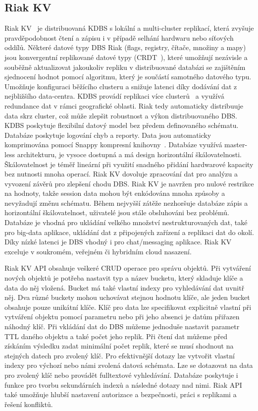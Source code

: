 \documentclass[czech,master,dept460,male,csharp,cpdeclaration]{diploma}
\begin{document}
	\subsection{Riak KV} \label{lab-riak}
	
	Riak KV~\cite{riak} je distribuovaná KDBS s lokální a multi-cluster replikací, která zvyšuje pravděpodobnost čtení a zápisu i v případě selhání hardwaru nebo síťových oddílů. Některé datové typy DBS Riak (flags, registry, čítače, množiny a mapy) jsou konvergentní replikované datové typy (CRDT~\cite{crdt, riakkv-crdt}), které umožňují nezávisle a souběžně aktualizovat jakoukoliv repliku v distribuované databázi se zajištěním sjednocení hodnot pomocí algoritmu, který je součástí samotného datového typu. Umožňuje konfiguraci běžícího clusteru a snižuje latenci díky dodávání dat z nejbližšího data-centra. KDBS provádí replikaci více clusterů~\cite{multicluster, riakkv-multiclustr} a využívá redundance dat v rámci geografické oblasti. Riak tedy automaticky distribuuje data skrz cluster, což může zlepšit robustnost a výkon distribuovaného DBS. KDBS poskytuje flexibilní datový model bez předem definovaného schématu. Databáze poskytuje logování chyb a reporty. Data jsou automaticky komprimována pomocí Snappy kompresní knihovny~\cite{snappy}. Databáze využívá master-less architekturu, je vysoce dostupná a má design horizontální škálovatelnosti. Škálovatelnost je téměř lineární při využití snadného přidání hardwarové kapacity bez nutnosti mnoha operací. Riak KV dovoluje zpracování dat pro analýzu a vyvození závěrů pro zlepšení chodu DBS. Riak KV je navržen pro nulové restrikce na hodnoty, takže session data mohou být enkódována mnoha způsoby a nevyžadují změnu schématu. Během nejvyšší zátěže nezhoršuje databáze zápis a horizontální škálovatelnost, uživatelé jsou stále obsluhováni bez problémů. Databáze je vhodná pro ukládání velkého množství nestrukturovaných dat, také pro big-data aplikace, ukládání dat z připojených zařízení a replikaci dat do okolí. Díky nízké latenci je DBS vhodný i pro chat/messaging aplikace. Riak KV exceluje v soukromém, veřejném či hybridním cloud nasazení.
	
	Riak KV API obsahuje veškeré CRUD operace pro správu objektů. Při vytváření nových objektů je potřeba nastavit typ a název bucketu, který skladuje klíče a data do něj vložená. Bucket má také vlastní indexy pro vyhledávání dat uvnitř něj. Dva různé buckety mohou uchovávat stejnou hodnotu klíče, ale jeden bucket obsahuje pouze unikátní klíče. Klíč pro data lze specifikovat explicitně vlastní při vytváření objektu pomocí parametru nebo při jeho absenci je datům přiřazen náhodný klíč. Při vkládání dat do DBS můžeme jednoduše nastavit parametr TTL daného objektu a také počet jeho replik. Při čtení dat můžeme před získáním výsledku zadat minimální počet replik, které se musí shodnout na stejných datech pro zvolený klíč. Pro efektivnější dotazy lze vytvořit vlastní indexy pro výchozí nebo námi zvolená datová schémata. Lze se dotazovat na data pro zvolený klíč nebo provádět fulltextové vyhledávání. Databáze poskytuje i funkce pro tvorbu sekundárních indexů a následné dotazy nad nimi. Riak API také umožňuje hlubší nastavení autorizace a bezpečnosti, práci s replikami a řešení konfliktů.
	
\end{document}
